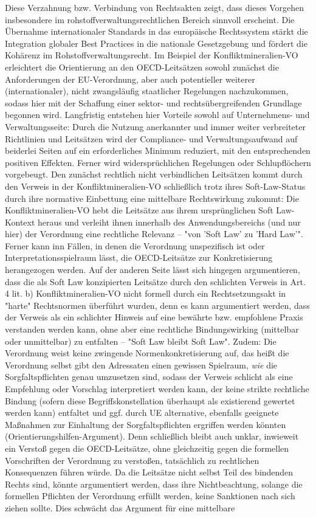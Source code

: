\documentclass[12pt,a4paper,oneside]{book} %
\begin{document}
Diese Verzahnung bzw. Verbindung von Rechtsakten zeigt, dass dieses Vorgehen insbesondere im rohstoffverwaltungsrechtlichen Bereich sinnvoll erscheint. Die Übernahme internationaler Standards in das europäische Rechtssystem stärkt die Integration globaler Best Practices in die nationale Gesetzgebung und fördert die Kohärenz im Rohstoffverwaltungsrecht. Im Beispiel der Konfliktmineralien-VO erleichtert die Orientierung an den OECD-Leitsätzen sowohl zunächst die Anforderungen der EU-Verordnung, aber auch potentieller weiterer (internationaler), nicht zwangsläufig staatlicher Regelungen nachzukommen, sodass hier mit der Schaffung einer sektor- und rechtsübergreifenden Grundlage begonnen wird. Langfristig entstehen hier Vorteile sowohl auf Unternehmens- und Verwaltungsseite: Durch die Nutzung anerkannter und immer weiter verbreiteter Richtlinien und Leitsätzen wird der Compliance- und Verwaltungsaufwand auf beiderlei Seiten auf ein erforderliches Minimum reduziert, mit den entsprechenden positiven Effekten. Ferner wird widersprüchlichen Regelungen oder Schlupflöchern vorgebeugt. Den zunächst rechtlich nicht verbindlichen Leitsätzen kommt durch den Verweis in der Konfliktmineralien-VO schließlich trotz ihres Soft-Law-Status durch ihre normative Einbettung eine mittelbare Rechtswirkung zukommt: Die Konfliktmineralien-VO hebt die Leitsätze aus ihrem ursprünglichen Soft Law-Kontext heraus und verleiht ihnen innerhalb des Anwendungsbereichs (und nur hier) der Verordnung eine rechtliche Relevanz -- "von 'Soft Law' zu 'Hard Law'"\autocite[42]{teicke_gesetzliche_2018}. Ferner kann inn Fällen, in denen die Verordnung unspezifisch ist oder Interpretationsspielraum lässt, die OECD-Leitsätze zur Konkretisierung herangezogen werden. Auf der anderen Seite lässt sich hingegen argumentieren, dass die als Soft Law konzipierten Leitsätze durch den schlichten Verweis in Art. 4 lit. b) Konfliktmineralien-VO nicht formell durch ein Rechtsetzungsakt in "harte" Rechtsnormen überführt wurden, denn es kann argumentiert werden, dass der Verweis als ein schlichter Hinweis auf eine bewährte bzw. empfohlene Praxis verstanden werden kann, ohne aber eine rechtliche Bindungswirking (mittelbar oder unmittelbar) zu entfalten -- "Soft Law bleibt Soft Law". Zudem: Die Verordnung weist keine zwingende Normenkonkretisierung auf, das heißt die Verordnung selbst gibt den Adressaten einen gewissen Spielraum, \textit{wie} die Sorgfaltspflichten genau umzusetzen sind, sodass der Verweis schlicht als eine Empfehlung oder Vorschlag interpretiert werden kann, der keine strikte rechtliche Bindung (sofern diese Begriffskonstellation überhaupt als existierend gewertet werden kann) entfaltet und ggf. durch UE alternative, ebenfalls geeignete Maßnahmen zur Einhaltung der Sorgfaltspflichten ergriffen werden könnten (Orientierungshilfen-Argument). Denn schließlich bleibt auch unklar, inwieweit ein Verstoß gegen die OECD-Leitsätze, ohne gleichzeitig gegen die formellen Vorschriften der Verordnung zu verstoßen, tatsächlich zu rechtlichen Konsequenzen führen würde. Da die Leitsätze nicht selbst Teil des bindenden Rechts sind, könnte argumentiert werden, dass ihre Nichtbeachtung, solange die formellen Pflichten der Verordnung erfüllt werden, keine Sanktionen nach sich ziehen sollte. Dies schwächt das Argument für eine mittelbare 
\end{document}
